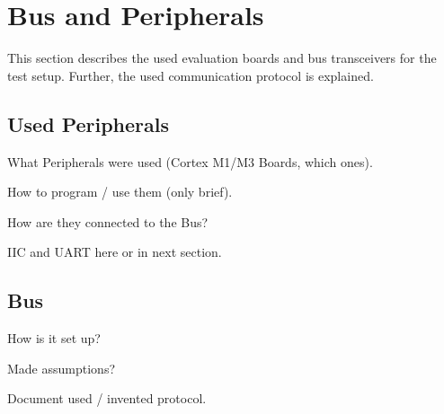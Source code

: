 \section{Bus and Peripherals}

This section describes the used evaluation boards and bus transceivers for the test setup. Further, the used communication protocol is explained.

\subsection{Used Peripherals}

What Peripherals were used (Cortex M1/M3 Boards, which ones).

How to program / use them (only brief).

How are they connected to the Bus?

IIC and UART here or in next section.

\subsection{Bus}

How is it set up?

Made assumptions?

Document used / invented protocol.

